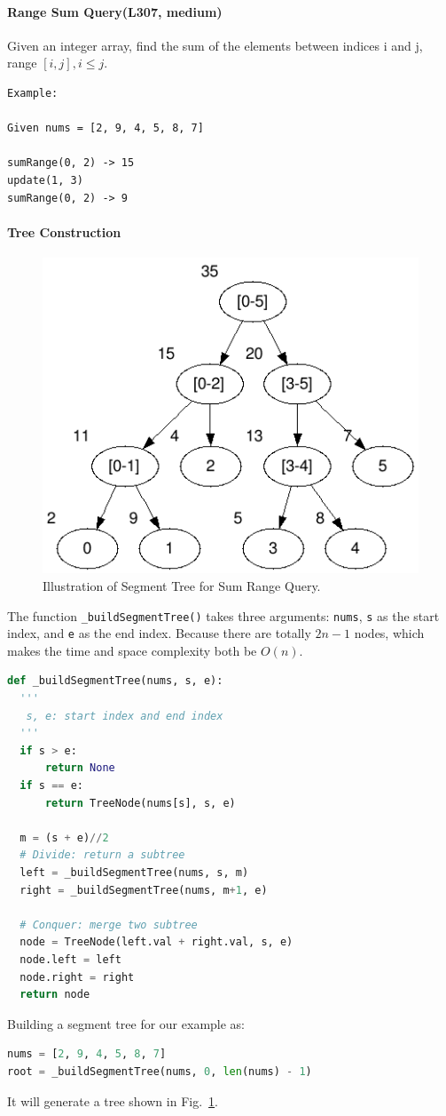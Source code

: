 \documentclass[main.tex]{subfiles}
\begin{document}
\paragraph{Range Sum Query(L307, medium)} Given an integer array, find the sum of the elements between indices i and j, range $[i, j], i\leq j$. 
\begin{lstlisting}[numbers=none]
Example:

Given nums = [2, 9, 4, 5, 8, 7]

sumRange(0, 2) -> 15
update(1, 3)
sumRange(0, 2) -> 9
\end{lstlisting}

\paragraph{Tree Construction}
\begin{figure}[h]
    \centering
    \includegraphics[width=0.6\columnwidth]{fig/segment_tree_construction.png}
    \caption{Illustration of Segment Tree for Sum Range Query. }
    \label{fig:segment_tree_construction}
\end{figure}
The function \texttt{\_buildSegmentTree()} takes three arguments: \texttt{nums}, \texttt{s} as the start index, and \texttt{e} as the end index. Because there are totally $2n-1$ nodes, which makes the time and space complexity both be $O(n)$.
\begin{lstlisting}[language=Python]
def _buildSegmentTree(nums, s, e):
  '''
   s, e: start index and end index
  '''
  if s > e:
      return None
  if s == e:
      return TreeNode(nums[s], s, e)
  
  m = (s + e)//2
  # Divide: return a subtree 
  left = _buildSegmentTree(nums, s, m)
  right = _buildSegmentTree(nums, m+1, e)
  
  # Conquer: merge two subtree
  node = TreeNode(left.val + right.val, s, e)
  node.left = left
  node.right = right
  return node
\end{lstlisting}
Building a segment tree for our example as:
\begin{lstlisting}[language=Python]
nums = [2, 9, 4, 5, 8, 7]
root = _buildSegmentTree(nums, 0, len(nums) - 1)
\end{lstlisting}
It will generate a tree shown in Fig.~\ref{fig:segment_tree_construction}. 
\end{document}
